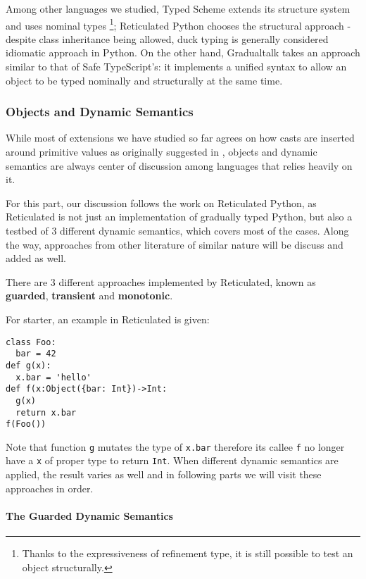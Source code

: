Among other languages we studied,
Typed Scheme extends its structure system and uses nominal types \footnote{Thanks to the expressiveness of refinement type, it is still possible to test an object structurally.};
Reticulated Python chooses the structural approach - despite class inheritance being allowed,
duck typing is generally considered idiomatic approach in Python.
On the other hand, Gradualtalk takes an approach similar to that of Safe TypeScript's:
it implements a unified syntax to allow an object to be typed nominally and structurally at the same time.

\subsubsection{Objects and Dynamic Semantics}

While most of extensions we have studied so far agrees on how casts are inserted
around primitive values as originally suggested in \cite{siek2006gradual},
objects and dynamic semantics are always center of discussion among languages
that relies heavily on it.

For this part, our discussion follows the work on Reticulated Python,
as Reticulated is not just an implementation of gradually typed Python,
but also a testbed of 3 different dynamic semantics, which covers most of the cases.
Along the way, approaches from other literature of similar nature will be discuss and added as well.

There are 3 different approaches implemented by Reticulated, known as \textbf{guarded}, \textbf{transient}
and \textbf{monotonic}.

For starter, an example in Reticulated is given:

\begin{verbatim}
class Foo:
  bar = 42
def g(x):
  x.bar = 'hello'
def f(x:Object({bar: Int})->Int:
  g(x)
  return x.bar
f(Foo())
\end{verbatim}

Note that function \texttt{g} mutates the type of \texttt{x.bar} therefore its callee \texttt{f}
no longer have a \texttt{x} of proper type to return \texttt{Int}.
When different dynamic semantics are applied, the result varies as well and in following parts
we will visit these approaches in order. 

\paragraph{The Guarded Dynamic Semantics}

